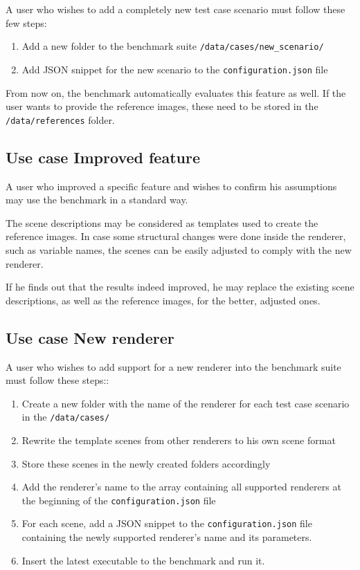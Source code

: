 A user who wishes to add a completely new test case scenario must follow these few steps:

\begin{enumerate}
	\item Add a new folder to the benchmark suite \texttt{/data/cases/new\_scenario/}
	\item Add JSON snippet for the new scenario to the \texttt{configuration.json} file
\end{enumerate}

From now on, the benchmark automatically evaluates this feature as well. If the user wants to provide the reference images, these need to be stored in the \texttt{/data/references} folder.

\subsection{Use case Improved feature}

A user who improved a specific feature and wishes to confirm his assumptions may use the benchmark in a standard way.

The scene descriptions may be considered as templates used to create the reference images. In case some structural changes were done inside the renderer, such as variable names, the scenes can be easily adjusted to comply with the new renderer.

If he finds out that the results indeed improved, he may replace the existing scene descriptions, as well as the reference images, for the better, adjusted ones.

\subsection{Use case New renderer}

A user who wishes to add support for a new renderer into the benchmark suite must follow these steps::

\begin{enumerate}
	\item Create a new folder with the name of the renderer for each test case scenario in the \texttt{/data/cases/}
	\item Rewrite the template scenes from other renderers to his own scene format
	\item Store these scenes in the newly created folders accordingly
	\item Add the renderer's name to the array containing all supported renderers at the beginning of the  \texttt{configuration.json} file
	\item For each scene, add a JSON snippet to the \texttt{configuration.json} file containing the newly supported renderer's name and its parameters.
	\item Insert the latest executable to the benchmark and run it.
\end{enumerate}

